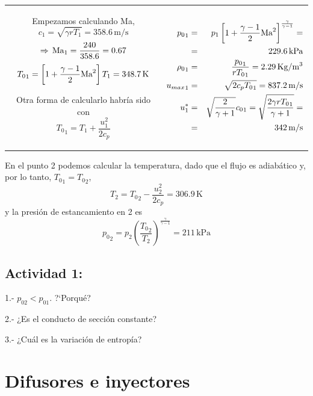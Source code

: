 		\begin{tabular}{c|c}
			\begin{minipage}[c]{0.45\textwidth}%
				Empezamos calculando Ma, {\footnotesize{}
					\[
					c_{1}=\sqrt{\gamma rT_{1}}=358.6\,\text{m/s}
					\]
					\[
					\Rightarrow\,\text{Ma}_{1}=\frac{240}{358.6}=0.67
					\]
					\[
					{T_{0}}_{1}=\left[1+\frac{\gamma-1}{2}\text{Ma}^{2}\right]T_{1}=348.7\,\text{K}
					\]
				}{\footnotesize\par}
				
				Otra forma de calcularlo habría sido con 
				\[
				{T_{0}}_{1}=T_{1}+\frac{u_{1}^{2}}{2c_{p}}
				\]
			\end{minipage} & %
			\begin{minipage}[c]{0.45\textwidth}%
				{\footnotesize{}
					\begin{eqnarray*}
						{p_{0}}_{1} & = & p_{1}\left[1+\frac{\gamma-1}{2}\text{Ma}^{2}\right]^{\frac{\gamma}{\gamma-1}}=\\
						& = & 229.6\,\text{kPa}\\
						{\rho_{0}}_{1} & = & \frac{{p_{0}}_{1}}{r{T_{0}}_{1}}=2.29\,\text{Kg}/\text{m}^{3}\\
						{u_{max}}_{1} & = & \sqrt{2c_{p}{T_{0}}_{1}}=837.2\,\text{m/s}\\
						u_{1}^{*} & = & \sqrt{\frac{2}{\gamma+1}}{c_{0}}_{1}=\sqrt{\frac{2\gamma r{T_{0}}_{1}}{\gamma+1}}=\\
						& = & 342\,\text{m/s}
					\end{eqnarray*}
				} %
			\end{minipage}\tabularnewline
		\end{tabular}
		
		En el punto 2 podemos calcular la temperatura, dado que el flujo
		es adiabático y, por lo tanto, ${T_{0}}_{1}={T_{0}}_{2}$, 
		\[
		T_{2}={T_{0}}_{2}-\frac{u_{2}^{2}}{2c_{p}}=306.9\,\text{K}
		\]
		y la presión de estancamiento en 2 es 
		\[
		{p_{0}}_{2}=p_{2}\left(\frac{{T_{0}}_{2}}{T_{2}}\right)^{\frac{\gamma}{\gamma-1}}=211\,\text{kPa}
		\]

\subsection*{Actividad 1:}
		
		1.- $p_{02}<p_{01}$. ?`Porqué?
		
		2.- ¿Es el conducto de sección constante?
		
		3.- ¿Cuál es la variación de entropía?

\section{Difusores e inyectores}


